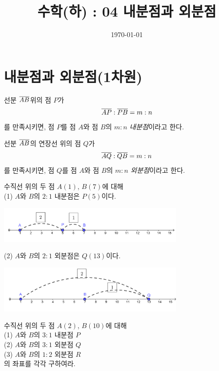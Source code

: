 \documentclass{oblivoir}
\begin{document}
\title{수학(하) : 04 내분점과 외분점}
\author{}
\date{\today}
\maketitle
\tableofcontents
\newpage

\section{내분점과 외분점(1차원)}

%
\begin{mdframed}
선분 \(\overline{AB}\)위의 점 \(P\)가
\[\overline{AP}:\overline{PB}=m:n\]
를 만족시키면, 점 \(P\)를 점 \(A\)와 점 \(B\)의 \(m:n\) \emph{내분점}이라고 한다.
\par\bigskip\noindent
선분 \(\overline{AB}\)의 연장선 위의 점 \(Q\)가
\[\overline{AQ}:\overline{QB}=m:n\]
를 만족시키면, 점 \(Q\)를 점 \(A\)와 점 \(B\)의 \(m:n\) \emph{외분점}이라고 한다.
\end{mdframed}

%
\exam{}\label{int01}
수직선 위의 두 점 \(A(1)\), \(B(7)\)에 대해\\
(1) \(A\)와 \(B\)의 \(2:1\) 내분점은 \(P(5)\)이다.\par
\begin{center}
\includegraphics[width=0.7\textwidth]{int_01}
\end{center}
(2) \(A\)와 \(B\)의 \(2:1\) 외분점은 \(Q(13)\)이다.
\begin{center}
\includegraphics[width=0.7\textwidth]{int_02}
\end{center}

%
\prob{}\label{int03}
수직선 위의 두 점 \(A(2)\), \(B(10)\)에 대해\\
(1) \(A\)와 \(B\)의 \(3:1\) 내분점 \(P\)\\
(2) \(A\)와 \(B\)의  \(3:1\) 외분점 \(Q\)\\
(3) \(A\)와 \(B\)의 \(1:2\) 외분점 \(R\)\\
의 좌표를 각각 구하여라.
\end{document}
